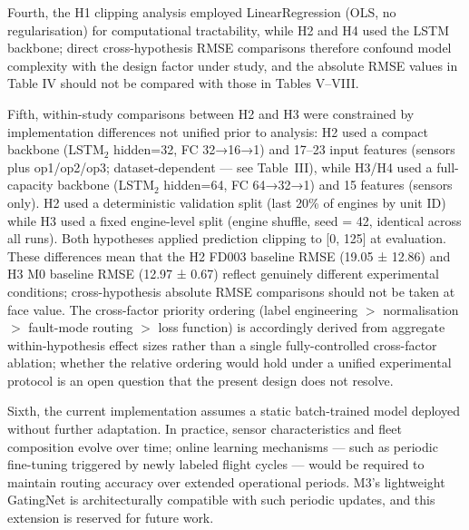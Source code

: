 \documentclass[review,12pt]{elsarticle}
\begin{document}
Fourth, the H1 clipping analysis employed LinearRegression (OLS, no regularisation) for computational tractability, while H2 and H4 used the LSTM backbone; direct cross-hypothesis RMSE comparisons therefore confound model complexity with the design factor under study, and the absolute RMSE values in Table IV should not be compared with those in Tables V–VIII.

Fifth, within-study comparisons between H2 and H3 were constrained by implementation differences not unified prior to analysis: H2 used a compact backbone (LSTM$_2$ hidden=32, FC 32→16→1) and 17--23 input features (sensors plus op1/op2/op3; dataset-dependent — see Table~III), while H3/H4 used a full-capacity backbone (LSTM$_2$ hidden=64, FC 64→32→1) and 15 features (sensors only). H2 used a deterministic validation split (last 20\% of engines by unit ID) while H3 used a fixed engine-level split (engine shuffle, seed = 42, identical across all runs). Both hypotheses applied prediction clipping to [0, 125] at evaluation. These differences mean that the H2 FD003 baseline RMSE (19.05 ± 12.86) and H3 M0 baseline RMSE (12.97 ± 0.67) reflect genuinely different experimental conditions; cross-hypothesis absolute RMSE comparisons should not be taken at face value. The cross-factor priority ordering (label engineering $>$ normalisation $>$ fault-mode routing $>$ loss function) is accordingly derived from aggregate within-hypothesis effect sizes rather than a single fully-controlled cross-factor ablation; whether the relative ordering would hold under a unified experimental protocol is an open question that the present design does not resolve.

Sixth, the current implementation assumes a static batch-trained model deployed without further adaptation. In practice, sensor characteristics and fleet composition evolve over time; online learning mechanisms — such as periodic fine-tuning triggered by newly labeled flight cycles — would be required to maintain routing accuracy over extended operational periods. M3's lightweight GatingNet is architecturally compatible with such periodic updates, and this extension is reserved for future work.
\end{document}
